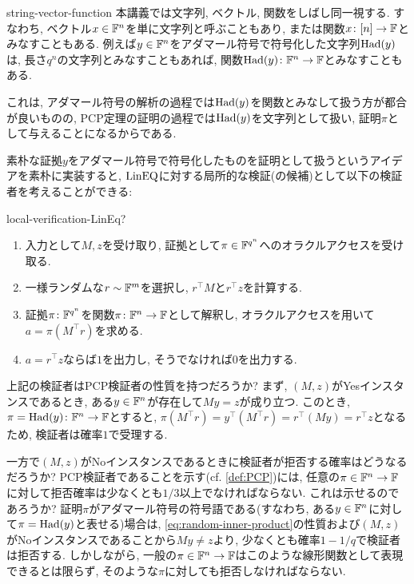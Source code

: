 \begin{remark}{}{string-vector-function}
  本講義では文字列, ベクトル, 関数をしばし同一視する.
  すなわち, ベクトル$x\in\mathbb{F}^n$を単に文字列と呼ぶこともあり,
  または関数$x\colon [n]\to\mathbb{F}$とみなすこともある.
  例えば$y\in\mathbb{F}^n$をアダマール符号で符号化した文字列$\mathrm{Had}(y)$は, 長さ$q^n$の文字列とみなすこともあれば,
  関数$\mathrm{Had}(y)\colon \mathbb{F}^n\to\mathbb{F}$とみなすこともある.

  これは, アダマール符号の解析の過程では$\mathrm{Had}(y)$を関数とみなして扱う方が都合が良いものの,
  PCP定理の証明の過程では$\mathrm{Had}(y)$を文字列として扱い, 証明$\pi$として与えることになるからである.
\end{remark}

素朴な証拠$y$をアダマール符号で符号化したものを証明として扱うというアイデアを素朴に実装すると, $\text{LinEQ}$に対する局所的な検証(の候補)として以下の検証者を考えることができる:
\begin{algo}{}{local-verification-LinEq?}
  \begin{enumerate}
  \item 入力として$M,z$を受け取り, 証拠として$\pi \in \mathbb{F}^{q^n}$へのオラクルアクセスを受け取る.
  \item 一様ランダムな$r\sim\mathbb{F}^m$を選択し, $r^\top M$と$r^\top z$を計算する.
  \item 証拠$\pi\colon \mathbb{F}^{q^n}$を関数$\pi\colon \mathbb{F}^n\to \mathbb{F}$として解釈し, オラクルアクセスを用いて$a=\pi(M^\top r)$を求める.
  \item $a=r^\top z$ならば$1$を出力し, そうでなければ$0$を出力する.
  \end{enumerate}
\end{algo}

上記の検証者はPCP検証者の性質を持つだろうか?
まず, $(M,z)$がYesインスタンスであるとき, ある$y\in\mathbb{F}^n$が存在して$My=z$が成り立つ.
このとき, $\pi=\mathrm{Had}(y)\colon\mathbb{F}^n\to\mathbb{F}$とすると, $\pi(M^\top r)=y^\top (M^\top r)=r^\top (My)=r^\top z$となるため, 検証者は確率$1$で受理する.

一方で$(M,z)$がNoインスタンスであるときに検証者が拒否する確率はどうなるだろうか?
PCP検証者であることを示す(cf. \cref{def:PCP})には, 任意の$\pi\in\mathbb{F}^n\to\mathbb{F}$に対して拒否確率は少なくとも$1/3$以上でなければならない.
これは示せるのであろうか?
証明$\pi$がアダマール符号の符号語である(すなわち, ある$y\in\mathbb{F}^n$に対して$\pi = \mathrm{Had}(y)$と表せる)場合は, \cref{eq:random-inner-product}の性質および$(M,z)$がNoインスタンスであることから$My\ne z$より, 少なくとも確率$1-1/q$で検証者は拒否する.
しかしながら, 一般の$\pi\in\mathbb{F}^n\to\mathbb{F}$はこのような線形関数として表現できるとは限らず, そのような$\pi$に対しても拒否しなければならない.

